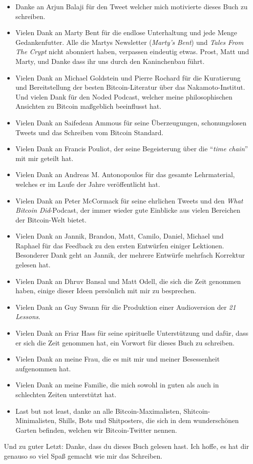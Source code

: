 \begin{itemize}
  \item Danke an Arjun Balaji für den Tweet welcher mich motivierte dieses Buch zu schreiben.
  \item Vielen Dank an Marty Bent für die endlose Unterhaltung und jede Menge Gedankenfutter. Alle die Martys Newsletter (\textit{Marty's Bent}) und \textit{Tales From The Crypt} nicht abonniert haben, verpassen eindeutig etwas. Prost, Matt und Marty, und Danke dass ihr uns durch den Kaninchenbau führt.
  \item Vielen Dank an Michael Goldstein und Pierre Rochard für die Kuratierung und Bereitstellung der besten Bitcoin-Literatur über das Nakamoto-Institut. Und vielen Dank für den Noded Podcast, welcher meine philosophischen Ansichten zu Bitcoin maßgeblich beeinflusst hat.
  \item Vielen Dank an Saifedean Ammous für seine Überzeugungen, schonungslosen Tweets und das Schreiben vom Bitcoin Standard.
  \item Vielen Dank an Francis Pouliot, der seine Begeisterung über die \enquote{\textit{time chain}} mit mir geteilt hat.
  \item Vielen Dank an Andreas M. Antonopoulos für das gesamte Lehrmaterial, welches er im Laufe der Jahre veröffentlicht hat.
  \item Vielen Dank an Peter McCormack für seine ehrlichen Tweets und den \textit{What Bitcoin Did}-Podcast, der immer wieder gute Einblicke aus vielen Bereichen der Bitcoin-Welt bietet.
  \item Vielen Dank an Jannik, Brandon, Matt, Camilo, Daniel, Michael und Raphael für das Feedback zu den ersten Entwürfen einiger Lektionen. Besonderer Dank geht an Jannik, der mehrere Entwürfe mehrfach Korrektur gelesen hat.
  \item Vielen Dank an Dhruv Bansal und Matt Odell, die sich die Zeit genommen haben, einige dieser Ideen persönlich mit mir zu besprechen.
  \item Vielen Dank an Guy Swann für die Produktion einer Audioversion der \textit{21 Lessons}.
  \item Vielen Dank an Friar Hass für seine spirituelle Unterstützung und dafür, dass er sich die Zeit genommen hat, ein Vorwort für dieses Buch zu schreiben.
  \item Vielen Dank an meine Frau, die es mit mir und meiner Besessenheit aufgenommen hat.
  \item Vielen Dank an meine Familie, die mich sowohl in guten als auch in schlechten Zeiten unterstützt hat.
  \item Last but not least, danke an alle Bitcoin-Maximalisten, Shitcoin-Minimalisten, Shills, Bots und Shitposters, die sich in dem wunderschönen Garten befinden, welchen wir Bitcoin-Twitter nennen.
\end{itemize}

Und zu guter Letzt: Danke, dass du dieses Buch gelesen hast. Ich hoffe, es hat dir genauso so viel Spaß gemacht wie mir das Schreiben.
